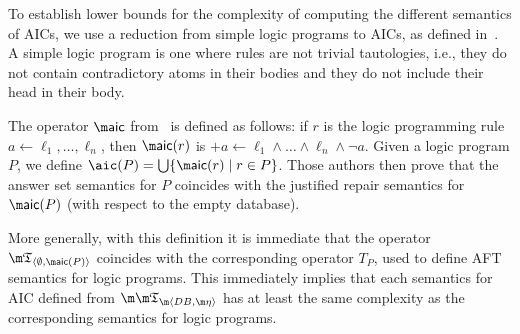 
To establish lower bounds for the complexity of computing the different semantics of AICs, we use a reduction from simple logic programs to AICs, as defined in~\cite{tplp/CaropreseT11}.
A simple logic program is one where rules are not trivial tautologies, i.e., they do not contain contradictory atoms in their bodies and they do not include their head in their body.

The operator $\aicop$ from~\cite{tplp/CaropreseT11} is defined as follows: if $r$ is the logic programming rule $a\leftarrow \ell_1,\ldots,\ell_n$, then $\aicop(r)$ is ${+a}\leftarrow \ell_1\wedge\ldots\wedge\ell_n\wedge\neg a$.
Given a logic program $P$, we define $\aic(P)=\bigcup\{\aicop(r)\mid r\in P\}$.
Those authors then prove that the answer set semantics for $P$ coincides with the justified repair semantics for $\aicop(P)$ (with respect to the empty database).

More generally, with this definition it is immediate that the operator $\threeap_{\langle\emptyset,\aicop(P)\rangle}$ coincides with the corresponding operator $T_P$, used to define AFT semantics for logic programs.
This immediately implies that each semantics for AIC defined from $\Apfull$ has at least the same complexity as the corresponding semantics for logic programs.

